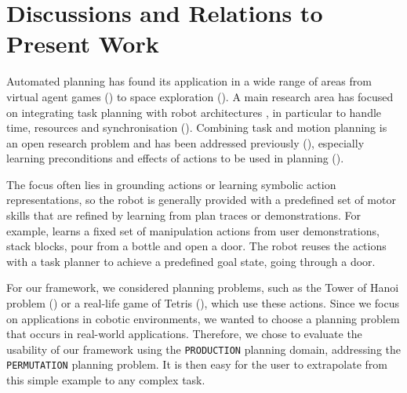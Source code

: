 \section{Discussions and Relations to Present Work}
Automated planning has found its application in a wide range of areas from virtual agent games (\cite{fernandez2006planning}) to space exploration (\cite{backes2004multi,bresina2005activity}).
A main research area has focused on integrating task planning with robot architectures \cite{cashmore2015rosplan}, in particular to handle time, resources and synchronisation (\cite{di2014planner,dvorak2014flexible}).
Combining task and motion planning is an open research problem and has been addressed previously (\cite{ferrer2015planning,garrett2015ffrob}), especially learning preconditions and effects of actions to be used in planning (\cite{ahmadzadeh2015learning,jetchev2013learning,konidaris2018fromSkills,ugur2015bottom}).

The focus often lies in grounding actions or learning symbolic action representations, so the robot is generally provided with a predefined set of motor skills that are refined by learning from plan traces or demonstrations.
For example, \citet{abdo2013learning} learns a fixed set of manipulation actions from user demonstrations, \ie stack blocks, pour from a bottle and open a door.
The robot reuses the actions with a task planner to achieve a predefined goal state, \eg going through a door.


For our framework, we considered planning problems, such as the Tower of Hanoi problem (\cite{douglas1985metamagical}) or a real-life game of Tetris (\cite{tetris}), which use these actions. 
Since we focus on applications in cobotic environments, we wanted to choose a planning problem that occurs in real-world applications. 
Therefore, we chose to evaluate the usability of our framework using the \texttt{PRODUCTION} planning domain, addressing the \texttt{PERMUTATION} planning problem. 
It is then easy for the user to extrapolate from this simple example to any complex task.


